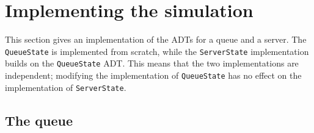 \section{Implementing the simulation}

This section gives an implementation of the ADTs for a queue and a
server. The \texttt{QueueState} is implemented from scratch, while the 
\texttt{ServerState} implementation builds on the \texttt{QueueState} ADT. This
means that the two implementations are independent; modifying the
implementation of \texttt{QueueState} has no effect on the implementation of
\texttt{ServerState}.
\subsection*{The queue}

